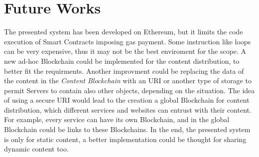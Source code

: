 \documentclass[hidelinks,conference,compsoc]{IEEEtran}
\begin{document}
\section{Future Works}
The presented system has been developed on Ethereum, but it limits the code execution of Smart Contracts imposing gas payment. Some instruction like loops can be very expensive, thus it may not be the best enviroment for the scope. A new ad-hoc Blockchain could be implemented for the content distribution, to better fit the requirments. 
Another improvment could be replacing the data of the content in the \textit{Content Blockchain} with an URI or another type of storage to permit Servers to contain also other objects, depending on the situation.
The idea of using a secure URI would lead to the creation a global Blockchain for content distribution, which different services and websites can entrust with their content. For example, every service can have its own Blockchain, and in the global Blockchain could be links to these Blockchains.
In the end, the presented system is only for static content, a better implementation could be thought for sharing dynamic content too.

%
%

\end{document}
